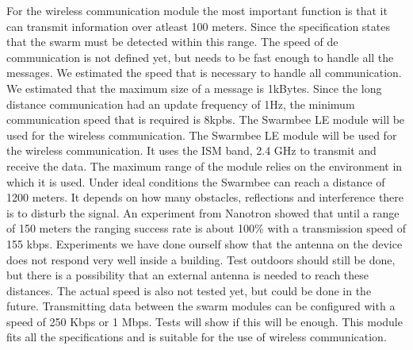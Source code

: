 \documentclass[10pt,a4paper]{article}
\begin{document}
For the wireless communication module the most important function is that it can transmit information over atleast 100 meters. Since the specification states that the swarm must be detected within this range. The speed of de communication is not defined yet, but needs to be fast enough to handle all the messages. We estimated the speed that is necessary to handle all communication. We estimated that the maximum size of a message is 1kBytes. Since the long distance communication had an update frequency of 1Hz, the minimum communication speed that is required is 8kpbs. The Swarmbee LE module will be used for the wireless communication. The Swarmbee LE module will be used for the wireless communication. It uses the ISM band, 2.4 GHz to transmit and receive the data. The maximum range of the module relies on the environment in which it is used. Under ideal conditions the Swarmbee can reach a distance of 1200 meters. It depends on how many obstacles, reflections and interference there is to disturb the signal. An experiment from Nanotron showed that until a range of 150 meters the ranging success rate is about 100\% with a transmission speed of 155 kbps. Experiments we have done ourself show that the antenna on the device does not respond very well inside a building. Test outdoors should still be done, but there is a possibility that an external antenna is needed to reach these distances. The actual speed is also not tested yet, but could be done in the future. Transmitting data between the swarm modules can be configured with a speed of 250 Kbps or 1 Mbps. Tests will show if this will be enough. This module fits all the specifications and is suitable for the use of wireless communication.
\end{document}
